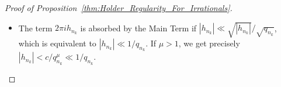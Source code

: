\documentclass[11pt,reqno]{amsart}
\theoremstyle{definition}
\begin{document}
\begin{proof}[Proof of Proposition~\ref{thm:Holder_Regularity_For_Irrationals}]
\begin{itemize}
$|G(p_{n_k},b_{n_k}, q_{n_k})| = \sqrt{2 q_{n_k}}$. 
	 Also, by \eqref{eq:Errors_Irrationals} and  \eqref{eq:s_n_k_For_Large_k},
	\begin{equation}\label{eq:Controlling_F}
	\frac{x_{n_k}}{\sqrt{|h_{n_k}|}}  = x_{n_k} \, q_{n_k}^{\mu_{n_k}/2} 
	< \frac{q_{n_k}^{\mu_{n_k}/2}}{q_{n_k}^\sigma}
	\leq \frac{q_{n_k}^{ \frac{\mu}{2} + \frac{\delta_1}{2} + \frac{\epsilon}{2}}}{q_{n_k}^\sigma}
	=   \frac{1}{q_{n_k}^{\sigma - \frac{\mu}{2} - \frac{\delta_1}{2} - \frac{\epsilon}{2}}}. 
	\end{equation}
	Hence, if $2\sigma > \mu + \delta_1$, we can choose $\epsilon = \sigma - \mu/2 - \delta_1 / 2 > 0$ and we get 
	\begin{equation}
	\lim_{k \to \infty} \frac{x_{n_k}}{\sqrt{|h_{n_k}|}}  
	\leq \lim_{k \to \infty} \frac{1}{q_{n_k}^{\sigma - \mu/2 - \delta_1/2  - \epsilon / 2}} 
	=  \lim_{k \to \infty} \frac{1}{q_{n_k}^{(\sigma - \mu/2 - \delta_1/2)/ 2}} 
	= 0.
	\end{equation}
	Since $F_\pm$ is continuous, we get $	| F_\pm (  x_{n_k}/|h_{n_k}|^{1/2} ) | \geq |F_\pm(0)| / 2 \simeq 1$ for all $ k \gg 1$. 
	Therefore, 
	\begin{equation}
	\text{Main term} 
	= \Big| \frac{\sqrt{|h_{n_k}|}}{q_{n_k}} \, G(p_{n_k}, b_{n_k}, q_{n_k}) \, F \Big(  \frac{x_{n_k}}{|h_{n_k}|^{1/2}}  \Big) \Big|
	\simeq \frac{\sqrt{|h_{n_k}|}}{\sqrt{q_{n_k}}}, \qquad \forall k \gg 1. 
	\end{equation}
	
	\item The term $2\pi i h_{n_k}$ is absorbed by the Main Term if $ |h_{n_k}| \ll \sqrt{|h_{n_k}|}/\sqrt{q_{n_k}}$, which is equivalent to $|h_{n_k}| \ll 1/q_{n_k}$.  
	If $ \mu > 1$, we get precisely $|h_{n_k}| < c/q_{n_k}^\mu \ll 1/q_{n_k}$. 


\end{itemize}
\end{proof}
\end{document}
